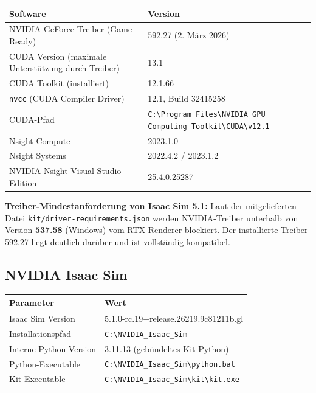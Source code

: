 \documentclass[11pt,a4paper]{article}
\begin{document}
\begin{center}
\begin{tabular}{ll}
  \toprule
  Software & Version \\
  \midrule
  NVIDIA GeForce Treiber (Game Ready) & 592.27 (2. März 2026) \\
  CUDA Version (maximale Unterstützung durch Treiber) & 13.1 \\
  CUDA Toolkit (installiert) & 12.1.66 \\
  \quad \texttt{nvcc} (CUDA Compiler Driver) & 12.1, Build 32415258 \\
  CUDA-Pfad & \texttt{C:\textbackslash{}Program Files\textbackslash{}NVIDIA GPU Computing Toolkit\textbackslash{}CUDA\textbackslash{}v12.1} \\
  Nsight Compute & 2023.1.0 \\
  Nsight Systems & 2022.4.2 / 2023.1.2 \\
  NVIDIA Nsight Visual Studio Edition & 25.4.0.25287 \\
  \bottomrule
\end{tabular}
\end{center}

\begin{notebox}
\textbf{Treiber-Mindestanforderung von Isaac Sim 5.1:}
Laut der mitgelieferten Datei \texttt{kit/driver-requirements.json}
werden NVIDIA-Treiber unterhalb von Version \textbf{537.58} (Windows)
vom RTX-Renderer blockiert. Der installierte Treiber 592.27 liegt
deutlich darüber und ist vollständig kompatibel.
\end{notebox}

\subsection{NVIDIA Isaac Sim}

\begin{center}
\begin{tabular}{ll}
  \toprule
  Parameter & Wert \\
  \midrule
  Isaac Sim Version & 5.1.0-rc.19+release.26219.9c81211b.gl \\
  Installationspfad & \texttt{C:\textbackslash{}NVIDIA\_Isaac\_Sim} \\
  Interne Python-Version & 3.11.13 (gebündeltes Kit-Python) \\
  Python-Executable & \texttt{C:\textbackslash{}NVIDIA\_Isaac\_Sim\textbackslash{}python.bat} \\
  Kit-Executable & \texttt{C:\textbackslash{}NVIDIA\_Isaac\_Sim\textbackslash{}kit\textbackslash{}kit.exe} \\
  \bottomrule
\end{tabular}
\end{center}
\end{document}
